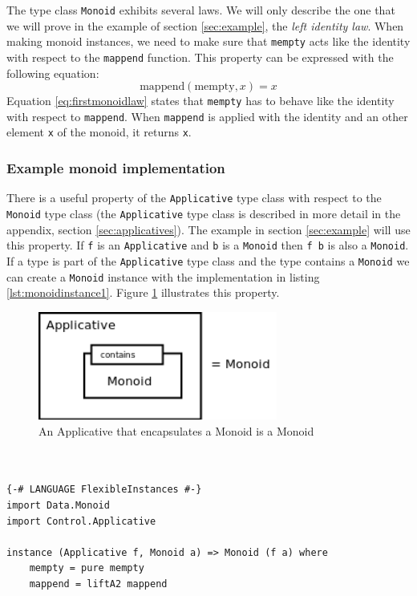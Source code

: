 The type class \verb|Monoid| exhibits several laws. We will only describe the one that we will prove in the example of section \ref{sec:example}, the \emph{left identity law}.
When making monoid instances, we need to make sure that \verb|mempty| acts like the identity with respect to the \verb|mappend| function. This property can be expressed with the following equation:
\begin{equation}
  \label{eq:firstmonoidlaw}
  \text{mappend}(\text{mempty}, x) = x
\end{equation}
Equation \ref{eq:firstmonoidlaw} states that \verb|mempty| has to behave like the identity with respect to \verb|mappend|. When \verb|mappend| is applied with the identity and an other element \verb|x| of the monoid, it returns \verb|x|.

\subsubsection{Example monoid implementation}

There is a useful property of the \verb|Applicative| type class with respect to the \verb|Monoid| type class (the \verb|Applicative| type class is described in more detail in the appendix, section \ref{sec:applicatives}). The example in section \ref{sec:example} will use this property. If \verb|f| is an \verb|Applicative| and \verb|b| is a \verb|Monoid| then \verb|f b| is also a \verb|Monoid|. If a type is part of the \verb|Applicative| type class and the type contains a \verb|Monoid| we can create a \verb|Monoid| instance with the implementation in listing \ref{lst:monoidinstance1}. Figure \ref{fig:applicative_monoid} illustrates this property.

\begin{figure}
  \centering
     \includegraphics[width=0.7\textwidth]{monoid}
  \caption{An {\ttfamily Applicative} that encapsulates a {\ttfamily Monoid} is a {\ttfamily Monoid}}
  \label{fig:applicative_monoid}
\end{figure}

\lstset{
basicstyle=\ttfamily,
columns=fullflexible,
keepspaces=true,
captionpos=b
}
\begin{lstlisting}[caption={{\ttfamily Monoid} instance implementation of {\ttfamily IO}},label={lst:monoidinstance1}]


{-# LANGUAGE FlexibleInstances #-} 
import Data.Monoid
import Control.Applicative 

instance (Applicative f, Monoid a) => Monoid (f a) where
    mempty = pure mempty
    mappend = liftA2 mappend
\end{lstlisting}

